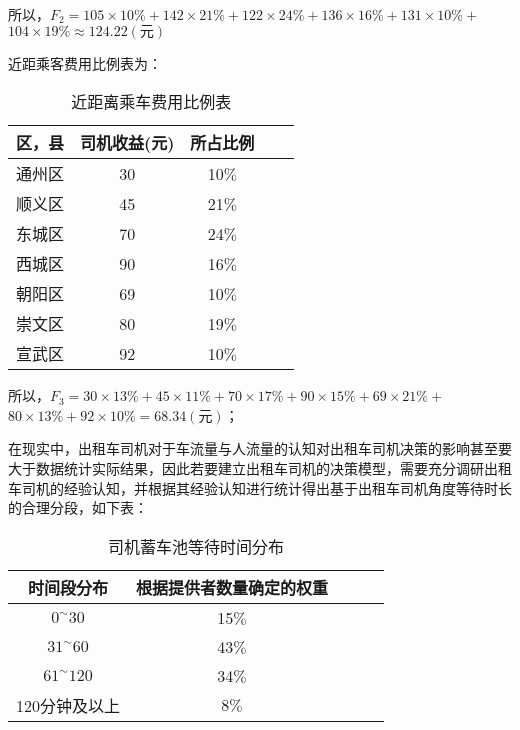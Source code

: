 \documentclass[withoutpreface,bwprint]{cumcmthesis} %
\begin{document}
所以，$F_{2}=105 \times 10 \%+142 \times 21 \%+122 \times 24 \%+136 \times 16 \%+131 \times 10 \%+$
$104 \times 19 \% \approx 124.22({\text{元}})$

近距乘客费用比例表为：

\begin{table}[!htbp]
	\caption{近距离乘车费用比例表}\label{tab:001} \centering
	\begin{tabular}{ccccc}
		\toprule[2pt]
		区，县 & 司机收益(元) & 所占比例\\
		\midrule[1pt]
		通州区 & 30 & 10$\%$\\
		顺义区 & 45 & 21$\%$\\
		东城区 & 70 & 24$\%$\\
		西城区 & 90 & 16$\%$\\
		朝阳区 & 69 & 10$\%$\\
		崇文区 & 80 & 19$\%$\\
		宣武区 & 92 & 10$\%$\\
		\bottomrule[1.5pt]
	\end{tabular}
\end{table}

所以，$F_{3}=30 \times 13 \%+45 \times 11 \%+70 \times 17 \%+90 \times 15 \%+69 \times 21 \%+$
$80 \times 13 \%+92 \times 10 \%=68.34({\text{元}}) $；

在现实中，出租车司机对于车流量与人流量的认知对出租车司机决策的影响甚至要大于数据统计实际结果，因此若要建立出租车司机的决策模型，需要充分调研出租车司机的经验认知，并根据其经验认知进行统计得出基于出租车司机角度等待时长的合理分段，如下表：

\begin{table}[!htbp]
	\caption{司机蓄车池等待时间分布}\label{tab:001} \centering
	\begin{tabular}{ccccc}
		\toprule[2pt]
		时间段分布& 根据提供者数量确定的权重\\
		\midrule[1pt]
		$0^{\sim} 30$ & 15$\%$\\
		$31^{\sim} 60$ & 43$\%$\\
		$61^{\sim} 120$ & 34$\%$\\
		120分钟及以上 & 8$\%$\\
		\bottomrule[1.5pt]
	\end{tabular}
\end{table}
\end{document}
